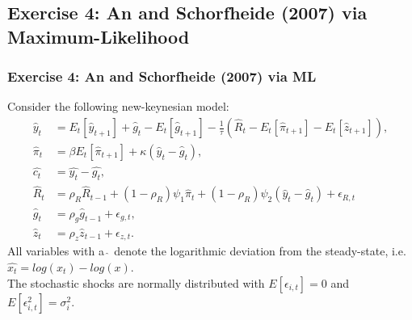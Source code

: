 \documentclass{beamer} %
\begin{document}
\subsection{Exercise 4: An and Schorfheide (2007) via Maximum-Likelihood}
\begin{frame}\frametitle{Exercise 4: An and Schorfheide (2007) via ML}
Consider the following new-keynesian model:
    \begin{align*}
  \widehat{y}_t &= E_t[\widehat{y}_{t+1}] + \widehat{g}_t - E_t[\widehat{g}_{t+1}] - \frac{1}{\tau} (\widehat{R}_t - E_t[\widehat{\pi}_{t+1}] - E_t[\widehat{z}_{t+1}]),\\
  \widehat{\pi}_t &= \beta E_t[\widehat{\pi}_{t+1}]+\kappa(\widehat{y}_t-\widehat{g}_t),\\
    \widehat{c_t} &= \widehat{y_t }- \widehat{g_t},\\
  \widehat{R}_{t} &= \rho_R \widehat{R}_{t-1} + (1-\rho_R)\psi_1 \widehat{\pi}_{t} + (1-\rho_R)\psi_2 \left(\widehat{y}_{t}-\widehat{g}_{t}\right) + \epsilon_{R,t}\\
 \widehat{g}_{t} &= \rho_g \widehat{g}_{t-1} + \epsilon_{g,{t}},\\
 \widehat{z}_{t} &= \rho_z \widehat{z}_{t-1} + \epsilon_{z,{t}}.
\end{align*}
All variables with a $\widehat{~}$ denote the logarithmic deviation from the steady-state, i.e. $\widehat{x_t}=log(x_t)-log(x)$. \\The stochastic shocks are normally distributed with $E[\epsilon_{i,t}]=0$ and $E[\epsilon_{i,t}^2]=\sigma_i^2$.
\end{frame}
\end{document}
